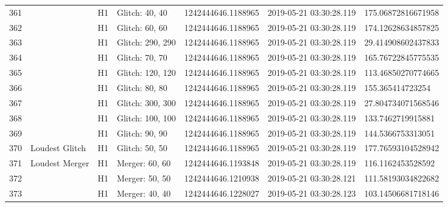 \begin{longtable}{lllllll}
361  &                                                    &       H1 &    Glitch: 40, 40 &  1242444646.1188965 &  2019-05-21 03:30:28.119 &  175.06872816671958 \\
362  &                                                    &       H1 &    Glitch: 60, 60 &  1242444646.1188965 &  2019-05-21 03:30:28.119 &  174.12628634857825 \\
363  &                                                    &       H1 &  Glitch: 290, 290 &  1242444646.1188965 &  2019-05-21 03:30:28.119 &  29.414908602437833 \\
364  &                                                    &       H1 &    Glitch: 70, 70 &  1242444646.1188965 &  2019-05-21 03:30:28.119 &  165.76722845775535 \\
365  &                                                    &       H1 &  Glitch: 120, 120 &  1242444646.1188965 &  2019-05-21 03:30:28.119 &  113.46850270774665 \\
366  &                                                    &       H1 &    Glitch: 80, 80 &  1242444646.1188965 &  2019-05-21 03:30:28.119 &    155.365414723254 \\
367  &                                                    &       H1 &  Glitch: 300, 300 &  1242444646.1188965 &  2019-05-21 03:30:28.119 &  27.804734071568546 \\
368  &                                                    &       H1 &  Glitch: 100, 100 &  1242444646.1188965 &  2019-05-21 03:30:28.119 &   133.7462719915881 \\
369  &                                                    &       H1 &    Glitch: 90, 90 &  1242444646.1188965 &  2019-05-21 03:30:28.119 &   144.5366753313051 \\
370  &                                     Loudest Glitch &       H1 &    Glitch: 50, 50 &  1242444646.1188965 &  2019-05-21 03:30:28.119 &  177.76593104528942 \\
371  &                                     Loudest Merger &       H1 &    Merger: 60, 60 &  1242444646.1193848 &  2019-05-21 03:30:28.119 &   116.1162453528592 \\
372  &                                                    &       H1 &    Merger: 50, 50 &  1242444646.1210938 &  2019-05-21 03:30:28.121 &  111.58193034822682 \\
373  &                                                    &       H1 &    Merger: 40, 40 &  1242444646.1228027 &  2019-05-21 03:30:28.123 &  103.14506681718146 \\

\end{longtable}
